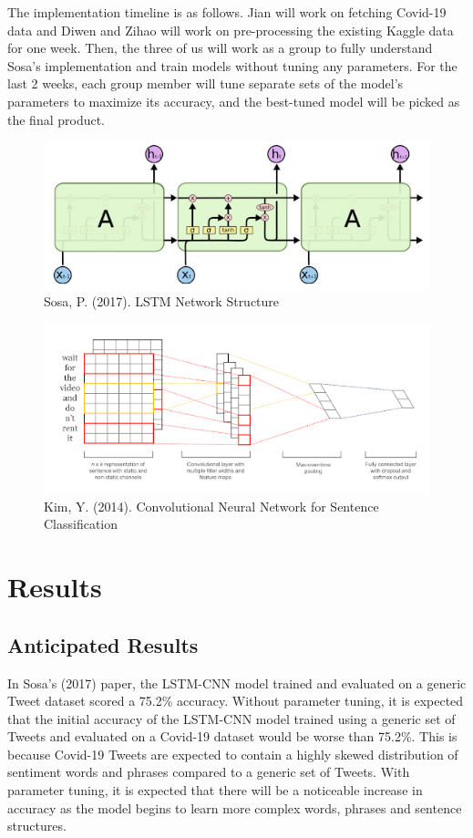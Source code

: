 \documentclass[letterpaper]{article} %
\begin{document}
The implementation timeline is as follows. Jian will work on fetching Covid-19 data and Diwen and Zihao will work on pre-processing the existing Kaggle data for one week. Then, the three of us will work as a group to fully understand Sosa's implementation and train models without tuning any parameters. For the last 2 weeks, each group member will tune separate sets of the model's parameters to maximize its accuracy, and the best-tuned model will be picked as the final product.

\begin{figure}
  \includegraphics[width=\linewidth]{figure2.png}
  \caption{Sosa, P. (2017). LSTM Network Structure}
  \label{fig:fig2}
\end{figure}


\begin{figure}
  \includegraphics[width=\linewidth]{figure3.png}
  \caption{Kim, Y. (2014). Convolutional Neural Network for Sentence Classification}
  \label{fig:fig3}
\end{figure}



\section{Results}

\subsection{Anticipated Results}
In Sosa's (2017) paper, the LSTM-CNN model trained and evaluated on a generic Tweet dataset scored a 75.2\% accuracy. Without parameter tuning, it is expected that the initial accuracy of the LSTM-CNN model trained using a generic set of Tweets and evaluated on a Covid-19 dataset would be worse than 75.2\%. This is because Covid-19 Tweets are expected to contain a highly skewed distribution of sentiment words and phrases compared to a generic set of Tweets. With parameter tuning, it is expected that there will be a noticeable increase in accuracy as the model begins to learn more complex words, phrases and sentence structures.
\end{document}

